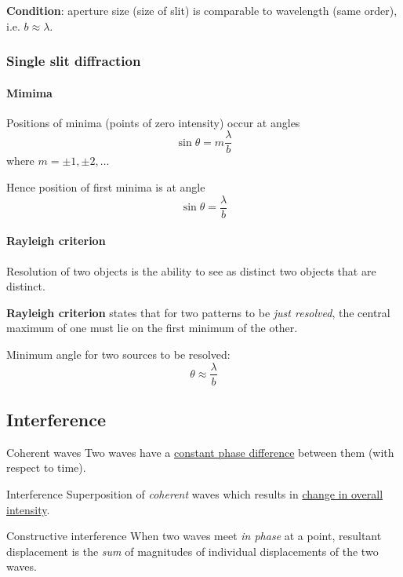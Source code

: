 \textbf{Condition}: aperture size (size of slit) is comparable to wavelength (same order), i.e. $b\approx\lambda$.

\subsubsection{Single slit diffraction}
\paragraph{Mimima}
Positions of minima (points of zero intensity) occur at angles
\[ \sin\theta=m\frac{\lambda}{b} \]
where $m=\pm1,\pm2,\dots$

Hence position of first minima is at angle
\begin{equation}
\sin\theta=\frac{\lambda}{b}
\end{equation}

\paragraph{Rayleigh criterion}
Resolution of two objects is the ability to see as distinct two objects that are distinct.

\textbf{Rayleigh criterion} states that for two patterns to be \emph{just resolved}, the central maximum of one must lie on the first minimum of the other.

Minimum angle for two sources to be resolved:
\begin{equation}
\theta\approx\frac{\lambda}{b}
\end{equation}

\subsection{Interference}
\begin{defn}{Coherent waves}{}
Two waves have a \underline{constant phase difference} between them (with respect to time).
\end{defn}

\begin{defn}{Interference}{}
Superposition of \emph{coherent} waves which results in \underline{change in overall intensity}.
\end{defn}

\begin{defn}{Constructive interference}{}
When two waves meet \emph{in phase} at a point, resultant displacement is the \emph{sum} of magnitudes of individual displacements of the two waves.
\end{defn}

